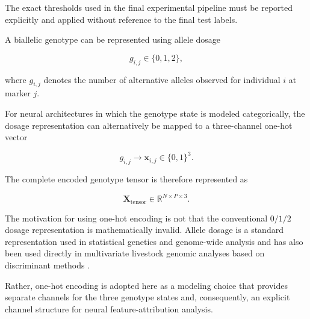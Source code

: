 The exact thresholds used in the final experimental pipeline must be
reported explicitly and applied without reference to the final test
labels.

%

A biallelic genotype can be represented using allele dosage

\begin{equation}
    g_{i,j}
    \in
    \{0,1,2\},
    \label{eq:allele_dosage}
\end{equation}

where $g_{i,j}$ denotes the number of alternative alleles observed
for individual $i$ at marker $j$.

For neural architectures in which the genotype state is modeled
categorically, the dosage representation can alternatively be
mapped to a three-channel one-hot vector

\begin{equation}
    g_{i,j}
    \longrightarrow
    \mathbf{x}_{i,j}
    \in
    \{0,1\}^{3}.
    \label{eq:one_hot_genotype}
\end{equation}

The complete encoded genotype tensor is therefore represented as

\begin{equation}
    \mathbf{X}_{\mathrm{tensor}}
    \in
    \mathbb{R}^{N \times P \times 3}.
    \label{eq:genotype_tensor}
\end{equation}

The motivation for using one-hot encoding is not that the
conventional $0/1/2$ dosage representation is mathematically
invalid.
Allele dosage is a standard representation used in statistical
genetics and genome-wide analysis
\cite{purcell2007plink}
and has also been used directly in multivariate livestock genomic
analyses based on discriminant methods
\cite{dimauro2013canonical, sorbolini2016signatures}.

Rather, one-hot encoding is adopted here as a modeling choice that
provides separate channels for the three genotype states and,
consequently, an explicit channel structure for neural
feature-attribution analysis.



